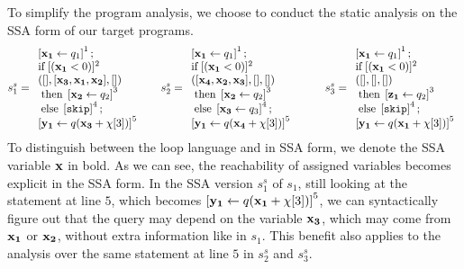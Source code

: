 To simplify the program analysis, we choose to conduct the static analysis on the SSA form of our target programs.   
%
%
%
\[
 s_1^{s} = \begin{array}{l}
      \left[  \mathrel{ {{\bf{{x_1}}}} \leftarrow q_1 } \right]^{1} ; \\
      \mbox{if\;}  [({{\bf{{x_1}}} }< 0 )]^{2}\\
      ([], [{ {\bf{{x_3, x_1,x_2}}} }], []) \\
      \mbox{\;then\;} \left[ \mathrel{ {{\bf{{x_2}}}} \leftarrow q_2 } \right]^{3}\\
      \mbox{\;else\;} \left[ \mathtt{skip} \right]^{4} ; \\
      \left[ \mathrel{ {{\bf{{y_1}}}} \leftarrow q({{\bf{{x_3}}} + \chi[3]}) } \right]^{5}
 \end{array}
 ~~~~~
  s_2^{s} = \begin{array}{l}
      \left[  \mathrel{ {{\bf{{x_1}}}} \leftarrow q_1 } \right]^{1} ; \\
      \mbox{if\;}  [({{\bf{{x_1}}}} < 0 )]^{2} \\
      ( [{{\bf{{x_4, x_2,x_3}}}}], [], [] ) \\
      \mbox{\;then\;} \left[ \mathrel{ {{\bf{{x_2}}}} \leftarrow q_2 } \right]^{3}\\
      \mbox{\;else\;} \left[ \mathrel{ {{\bf{{x_3}}}} \leftarrow q_3 } \right]^{4} ; \\
      \left[ \mathrel{ {{\bf{{y_1}}}} \leftarrow q({{\bf{{x_4}}}}+\chi[3]) } \right]^{5}
 \end{array}
 ~~~~~~~~
  s_3^{s} = \begin{array}{l}
      \left[  \mathrel{ {{\bf{{x_1}}}} \leftarrow q_1 } \right]^{1} ; \\
      \mbox{if\;}  [({{\bf{{x_1}}}} < 0 )]^{2} \\
       ( [], [], [] ) \\
      \mbox{\;then\;} \left[ \mathrel{ {{\bf{{z_1}}}} \leftarrow q_2 } \right]^{3}\\
      \mbox{\;else\;} \left[ \mathtt{skip} \right]^{4} ; \\
      \left[ \mathrel{ {{\bf{{y_1}}}} \leftarrow q({{\bf{{x_1}}}}+\chi[3]) } \right]^{5}
 \end{array}
\]
%
To distinguish between the {loop} language and in SSA form, we denote the SSA variable ${{\bf{{x}}}}$ in bold. As we can see, the reachability of assigned variables becomes explicit in the SSA form. In the SSA version $s_1^s$ of $s_1$, still looking at the statement at line $5$, which becomes $\left[ \mathrel{ {{\bf{{y_1}}}} \leftarrow q({{\bf{{x_1}}}}+\chi[3]) } \right]^{5} $, we can syntactically figure out that the query may depend on the variable ${\bf{{x_3}}}$, which may come from ${\bf{{x_1}}}$ or ${\bf{{x_2}}}$, without extra information like in $s_1$. This benefit also applies to the analysis over the same statement at line $5$ in $s_2^s$ and $s_3^s$.  



